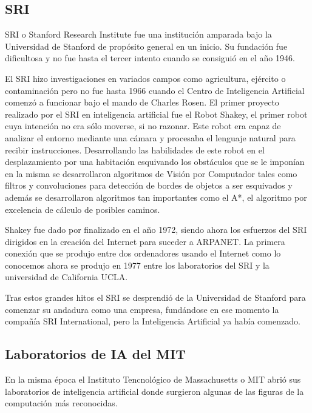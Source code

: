 \subsection{SRI}
SRI o Stanford Research Institute fue una institución amparada bajo la Universidad de Stanford de propósito general en un inicio. Su fundación fue dificultosa y no fue hasta el tercer intento cuando se consiguió en el año 1946.

\vspace{10px}

El SRI hizo investigaciones en variados campos como agricultura, ejército o contaminación pero no fue hasta 1966 cuando el Centro de Inteligencia Artificial comenzó a funcionar bajo el mando de Charles Rosen. El primer proyecto realizado por el SRI en inteligencia artificial fue el Robot Shakey, el primer robot cuya intención no era sólo moverse, si no razonar. Este robot era capaz de analizar el entorno mediante una cámara y procesaba el lenguaje natural para recibir instrucciones. Desarrollando las habilidades de este robot en el desplazamiento por una habitación esquivando los obstáculos que se le imponían en la misma se desarrollaron algoritmos de Visión por Computador tales como filtros y convoluciones para detección de bordes de objetos a ser esquivados y además se desarrollaron algoritmos tan importantes como el A*, el algoritmo por excelencia de cálculo de posibles caminos.

\vspace{10px}

Shakey fue dado por finalizado en el año 1972, siendo ahora los esfuerzos del SRI dirigidos en la creación del Internet para suceder a ARPANET. La primera conexión que se produjo entre dos ordenadores usando el Internet como lo conocemos ahora se produjo en 1977 entre los laboratorios del SRI y la universidad de California UCLA.

\vspace{10px}

Tras estos grandes hitos el SRI se desprendió de la Universidad de Stanford para comenzar su andadura como una empresa, fundándose en ese momento la compañía SRI International, pero la Inteligencia Artificial ya había comenzado.

\subsection{Laboratorios de IA del MIT}
En la misma época el Instituto Tencnológico de Massachusetts o MIT abrió sus laboratorios de inteligencia artificial donde surgieron algunas de las figuras de la computación más reconocidas.
